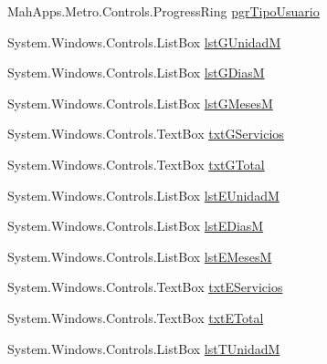 \begin{DoxyCompactItemize}
Mah\-Apps.\-Metro.\-Controls.\-Progress\-Ring \hyperlink{class_proyecto___integrador__3_1_1_reportes_1_1_reporte_frecuencia_de_uso_a6e3380fcd1c9e0e520f2867c8a98d9f0}{pgr\-Tipo\-Usuario}
\item 
System.\-Windows.\-Controls.\-List\-Box \hyperlink{class_proyecto___integrador__3_1_1_reportes_1_1_reporte_frecuencia_de_uso_a809e49373e88f304b1f3d5283d757c61}{lst\-G\-Unidad\-M}
\item 
System.\-Windows.\-Controls.\-List\-Box \hyperlink{class_proyecto___integrador__3_1_1_reportes_1_1_reporte_frecuencia_de_uso_a53386efc7578719e8fa049b5b2540f66}{lst\-G\-Dias\-M}
\item 
System.\-Windows.\-Controls.\-List\-Box \hyperlink{class_proyecto___integrador__3_1_1_reportes_1_1_reporte_frecuencia_de_uso_a8c5a6768727a54835e71fce7e83a1392}{lst\-G\-Meses\-M}
\item 
System.\-Windows.\-Controls.\-Text\-Box \hyperlink{class_proyecto___integrador__3_1_1_reportes_1_1_reporte_frecuencia_de_uso_a9460b0c95f1995a1b69bbedac9c7994b}{txt\-G\-Servicios}
\item 
System.\-Windows.\-Controls.\-Text\-Box \hyperlink{class_proyecto___integrador__3_1_1_reportes_1_1_reporte_frecuencia_de_uso_ab7449cb696ced128cf9d785055ca3850}{txt\-G\-Total}
\item 
System.\-Windows.\-Controls.\-List\-Box \hyperlink{class_proyecto___integrador__3_1_1_reportes_1_1_reporte_frecuencia_de_uso_a061126bfb2b2fa1c828210ef06f6c495}{lst\-E\-Unidad\-M}
\item 
System.\-Windows.\-Controls.\-List\-Box \hyperlink{class_proyecto___integrador__3_1_1_reportes_1_1_reporte_frecuencia_de_uso_a2b516015fab6b55141fe0b999e36e520}{lst\-E\-Dias\-M}
\item 
System.\-Windows.\-Controls.\-List\-Box \hyperlink{class_proyecto___integrador__3_1_1_reportes_1_1_reporte_frecuencia_de_uso_a5adb40758c162bfdc84fd55c49440e4e}{lst\-E\-Meses\-M}
\item 
System.\-Windows.\-Controls.\-Text\-Box \hyperlink{class_proyecto___integrador__3_1_1_reportes_1_1_reporte_frecuencia_de_uso_a22182387460111695b414013af099899}{txt\-E\-Servicios}
\item 
System.\-Windows.\-Controls.\-Text\-Box \hyperlink{class_proyecto___integrador__3_1_1_reportes_1_1_reporte_frecuencia_de_uso_a889f0abb3a420a38d963de4e364ef744}{txt\-E\-Total}
\item 
System.\-Windows.\-Controls.\-List\-Box \hyperlink{class_proyecto___integrador__3_1_1_reportes_1_1_reporte_frecuencia_de_uso_ab12e78b5f637eefdfde63fba310cfaf5}{lst\-T\-Unidad\-M}

\end{DoxyCompactItemize}
